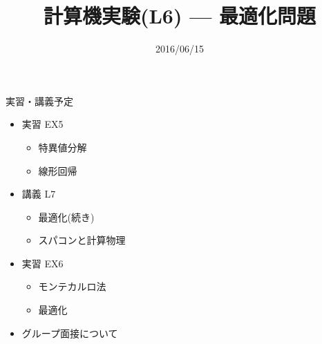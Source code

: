 \documentclass[dvipdfmx]{beamer}
\title{計算機実験(L6) --- 最適化問題}
\date{2016/06/15}
\begin{document}
\begin{frame}
  \titlepage
  \tableofcontents
\end{frame}








\section{}

\begin{frame}[t,fragile]{実習・講義予定}
  \begin{itemize}
    \setlength{\itemsep}{1em}
  \item 実習 EX5
    \begin{itemize}
    \item 特異値分解
    \item 線形回帰
    \end{itemize}
  \item 講義 L7
    \begin{itemize}
    \item 最適化(続き)
    \item スパコンと計算物理
    \end{itemize}
  \item 実習 EX6
    \begin{itemize}
    \item モンテカルロ法
    \item 最適化
    \end{itemize}
  \item グループ面接について
  \end{itemize}
\end{frame}
\end{document}
